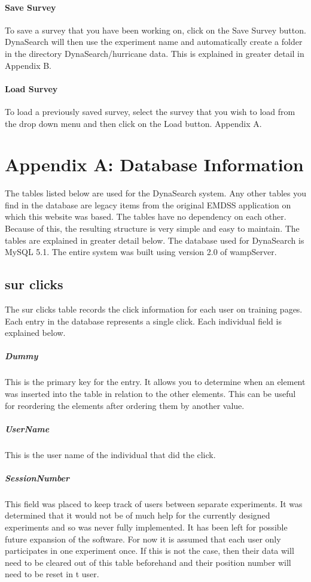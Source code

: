 \documentclass[article]{ij4uq}              %
\begin{document}
\paragraph{Save Survey}
To save a survey that you have been working on, click on the Save Survey button. DynaSearch will then use the experiment name and automatically create a folder in the directory DynaSearch/hurricane data. This is explained in greater detail in Appendix B.

\paragraph{Load Survey}
To load a previously saved survey, select the survey that you wish to load from the drop down menu and then click on the Load button. 
Appendix A.

\section{Appendix A: Database Information}
The tables listed below are used for the DynaSearch system. Any other tables you find in the database are legacy items from the original EMDSS application on which this website was based. The tables have no dependency on each other. Because of this, the resulting structure is very simple and easy to maintain. The tables are explained in greater detail below. The database used for DynaSearch is MySQL 5.1. The entire system was built using version 2.0 of wampServer.

\subsection{sur clicks}
The sur clicks table records the click information for each user on training pages. Each entry in the database represents a single click. Each individual field is explained below. 

\subparagraph{Dummy}
This is the primary key for the entry. It allows you to determine when an element was inserted into the table in relation to the other elements. This can be useful for reordering the elements after ordering them by another value.

\subparagraph{UserName}
This is the user name of the individual that did the click.

\subparagraph{SessionNumber}
This field was placed to keep track of users between separate experiments. It was determined that it would not be of much help for the currently designed experiments and so was never fully implemented. It has been left for possible future expansion of the software. For now it is assumed that each user only participates in one experiment once. If this is not the case, then their data will need to be cleared out of this table beforehand and their position number will need to be reset in t user.
\end{document}
